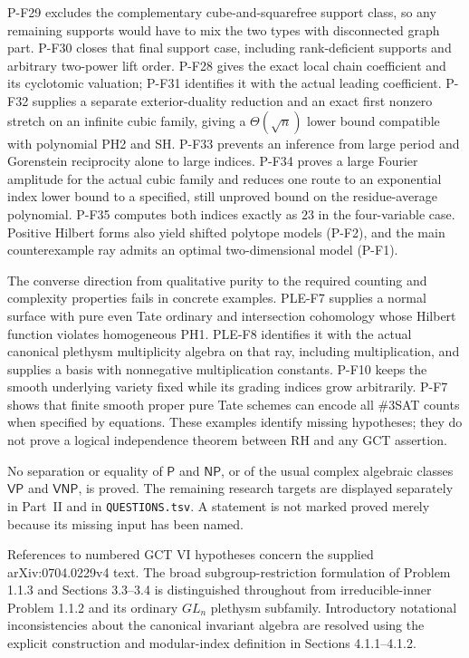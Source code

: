 \documentclass[11pt,a4paper]{article}
\begin{document}
P-F29 excludes the complementary cube-and-squarefree support class,
so any remaining supports would have to mix the two types with
disconnected graph part. P-F30 closes that final support case,
including rank-deficient supports and arbitrary two-power lift order.
P-F28 gives the exact local chain coefficient and its cyclotomic
valuation; P-F31 identifies it with the actual leading coefficient.
P-F32 supplies a separate exterior-duality reduction and an exact
first nonzero stretch on an infinite cubic family, giving a
$\Theta(\sqrt n)$ lower bound compatible with polynomial PH2 and SH.
P-F33 prevents an inference from large period and Gorenstein
reciprocity alone to large indices. P-F34 proves a large Fourier
amplitude for the actual cubic family and reduces one route to
an exponential index lower bound to a specified, still unproved
bound on the residue-average polynomial. P-F35 computes both
indices exactly as $23$ in the four-variable case.
Positive Hilbert forms also yield
shifted polytope models (P-F2), and the main counterexample ray admits
an optimal two-dimensional model (P-F1).

The converse direction from qualitative purity to the required counting
and complexity properties fails in concrete examples. PLE-F7 supplies a
normal surface with pure even Tate ordinary and intersection cohomology
whose Hilbert function violates homogeneous PH1. PLE-F8 identifies it
with the actual canonical plethysm multiplicity algebra on that ray,
including multiplication, and supplies a basis with nonnegative
multiplication constants. P-F10 keeps the smooth
underlying variety fixed while its grading indices grow arbitrarily.
P-F7 shows that finite smooth proper pure Tate schemes can encode all
\#3SAT counts when specified by equations. These examples identify
missing hypotheses; they do not prove a logical independence theorem
between RH and any GCT assertion.

No separation or equality of $\mathsf P$ and $\mathsf{NP}$, or of the
usual complex algebraic classes $\mathsf{VP}$ and $\mathsf{VNP}$, is
proved. The remaining research targets are displayed separately in
Part~II and in \texttt{QUESTIONS.tsv}. A statement is not marked proved
merely because its missing input has been named.

References to numbered GCT VI hypotheses concern the supplied
arXiv:0704.0229v4 text. The broad subgroup-restriction formulation
of Problem 1.1.3 and Sections 3.3--3.4 is distinguished throughout
from irreducible-inner Problem 1.1.2 and its ordinary $GL_n$
plethysm subfamily. Introductory notational inconsistencies about
the canonical invariant algebra are resolved using the explicit
construction and modular-index definition in Sections 4.1.1--4.1.2.
\end{document}
